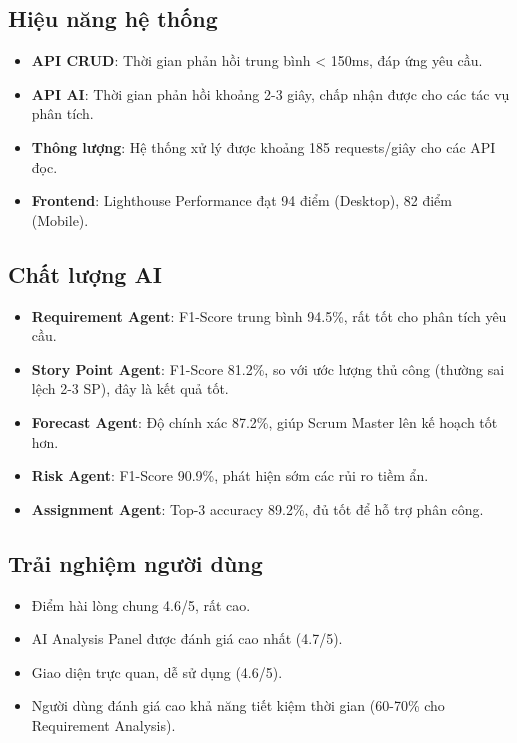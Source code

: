 \documentclass[12pt,a4paper]{report}
\begin{document}
\subsection{Hiệu năng hệ thống}

\begin{itemize}
\item \textbf{API CRUD}: Thời gian phản hồi trung bình < 150ms, đáp ứng yêu cầu.
\item \textbf{API AI}: Thời gian phản hồi khoảng 2-3 giây, chấp nhận được cho các tác vụ phân tích.
\item \textbf{Thông lượng}: Hệ thống xử lý được khoảng 185 requests/giây cho các API đọc.
\item \textbf{Frontend}: Lighthouse Performance đạt 94 điểm (Desktop), 82 điểm (Mobile).
\end{itemize}

\subsection{Chất lượng AI}

\begin{itemize}
\item \textbf{Requirement Agent}: F1-Score trung bình 94.5\%, rất tốt cho phân tích yêu cầu.
\item \textbf{Story Point Agent}: F1-Score 81.2\%, so với ước lượng thủ công (thường sai lệch 2-3 SP), đây là kết quả tốt.
\item \textbf{Forecast Agent}: Độ chính xác 87.2\%, giúp Scrum Master lên kế hoạch tốt hơn.
\item \textbf{Risk Agent}: F1-Score 90.9\%, phát hiện sớm các rủi ro tiềm ẩn.
\item \textbf{Assignment Agent}: Top-3 accuracy 89.2\%, đủ tốt để hỗ trợ phân công.
\end{itemize}

\subsection{Trải nghiệm người dùng}

\begin{itemize}
\item Điểm hài lòng chung 4.6/5, rất cao.
\item AI Analysis Panel được đánh giá cao nhất (4.7/5).
\item Giao diện trực quan, dễ sử dụng (4.6/5).
\item Người dùng đánh giá cao khả năng tiết kiệm thời gian (60-70\% cho Requirement Analysis).
\end{itemize}
\end{document}
